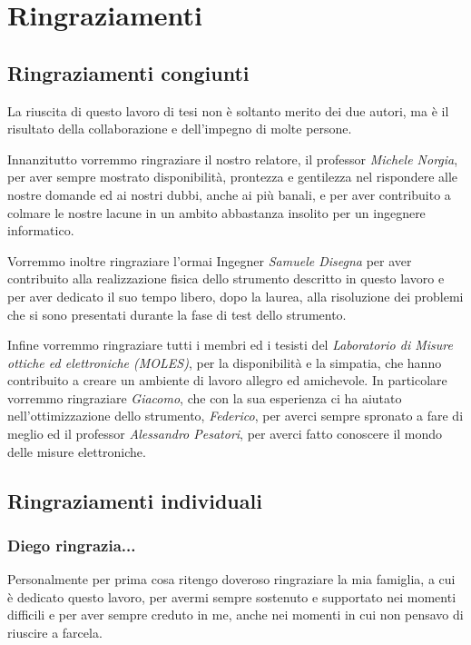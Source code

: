 \chapter*{Ringraziamenti}
\label{ringraziamenti}
\thispagestyle{empty}

\section*{Ringraziamenti congiunti}
La riuscita di questo lavoro di tesi non è soltanto merito dei due autori, ma è il risultato della collaborazione e dell'impegno di molte persone.

Innanzitutto vorremmo ringraziare il nostro relatore, il professor \textit{Michele Norgia}, per aver sempre mostrato disponibilità, prontezza e gentilezza nel rispondere alle nostre domande ed ai nostri dubbi, anche ai più banali, e per aver contribuito a colmare le nostre lacune in un ambito abbastanza insolito per un ingegnere informatico.

Vorremmo inoltre ringraziare l'ormai Ingegner \textit{Samuele Disegna} per aver contribuito alla realizzazione fisica dello strumento descritto in questo lavoro e per aver dedicato il suo tempo libero, dopo la laurea, alla risoluzione dei problemi che si sono presentati durante la fase di test dello strumento.

Infine vorremmo ringraziare tutti i membri ed i tesisti del \textit{Laboratorio di Misure ottiche ed elettroniche (MOLES)}, per la disponibilità e la simpatia, che hanno contribuito a creare un ambiente di lavoro allegro ed amichevole. In particolare vorremmo ringraziare \textit{Giacomo}, che con la sua esperienza ci ha aiutato nell'ottimizzazione dello strumento, \textit{Federico}, per averci sempre spronato a fare di meglio ed il professor \textit{Alessandro Pesatori}, per averci fatto conoscere il mondo delle misure elettroniche.

\section*{Ringraziamenti individuali}
\subsection*{Diego ringrazia...}

Personalmente per prima cosa ritengo doveroso ringraziare la mia famiglia, a cui è dedicato questo lavoro, per avermi sempre sostenuto e supportato nei momenti difficili e per aver sempre creduto in me, anche nei momenti in cui non pensavo di riuscire a farcela.


